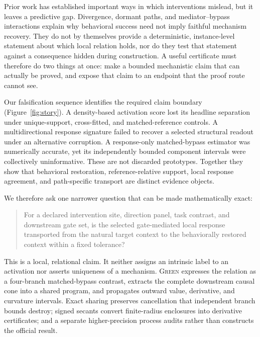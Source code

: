 \documentclass{article}
\newcommand{\green}{\textsc{Green}}
\begin{document}
Prior work has established important ways in which interventions mislead, but it leaves a predictive gap. Divergence, dormant paths, and mediator--bypass interactions explain why behavioral success need not imply faithful mechanism recovery. They do not by themselves provide a deterministic, instance-level statement about which local relation holds, nor do they test that statement against a consequence hidden during construction. A useful certificate must therefore do two things at once: make a bounded mechanistic claim that can actually be proved, and expose that claim to an endpoint that the proof route cannot see.

Our falsification sequence identifies the required claim boundary (Figure~\ref{fig:story}). A density-based activation score lost its headline separation under unique-support, cross-fitted, and matched-reference controls. A multidirectional response signature failed to recover a selected structural readout under an alternative corruption. A response-only matched-bypass estimator was numerically accurate, yet its independently bounded component intervals were collectively uninformative. These are not discarded prototypes. Together they show that behavioral restoration, reference-relative support, local response agreement, and path-specific transport are distinct evidence objects.

We therefore ask one narrower question that can be made mathematically exact:
\begin{quote}
For a declared intervention site, direction panel, task contrast, and downstream gate set, is the selected gate-mediated local response transported from the natural target context to the behaviorally restored context within a fixed tolerance?
\end{quote}
This is a local, relational claim. It neither assigns an intrinsic label to an activation nor asserts uniqueness of a mechanism. \green{} expresses the relation as a four-branch matched-bypass contrast, extracts the complete downstream causal cone into a shared program, and propagates outward value, derivative, and curvature intervals. Exact sharing preserves cancellation that independent branch bounds destroy; signed secants convert finite-radius enclosures into derivative certificates; and a separate higher-precision process audits rather than constructs the official result.
\end{document}
